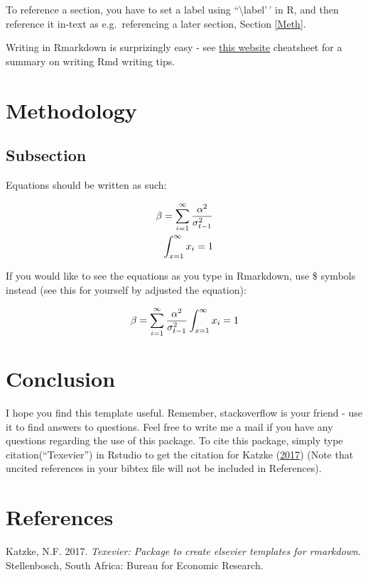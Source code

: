 \documentclass[11pt,preprint, authoryear]{elsarticle}
\numberwithin{equation}{section}
\numberwithin{figure}{section}
\numberwithin{table}{section}
\newlength{\cslhangindent}
\newenvironment{CSLReferences}%
  {\setlength{\parindent}{0pt}%
  \everypar{\setlength{\hangindent}{\cslhangindent}}\ignorespaces}%
  {\par}
\begin{document}
To reference a section, you have to set a label using
``\textbackslash label'\,' in R, and then reference it in-text as
e.g.~referencing a later section, Section \ref{Meth}.

Writing in Rmarkdown is surprizingly easy - see
\href{https://www.rstudio.com/wp-content/uploads/2015/03/rmarkdown-reference.pdf}{this
website} cheatsheet for a summary on writing Rmd writing tips.

\hypertarget{methodology}{%
\section{\texorpdfstring{Methodology
\label{Meth}}{Methodology }}\label{methodology}}

\hypertarget{subsection}{%
\subsection{Subsection}\label{subsection}}

Equations should be written as such:

\begin{align}
\beta = \sum_{i = 1}^{\infty}\frac{\alpha^2}{\sigma_{t-1}^2} \label{eq1} \\
\int_{x = 1}^{\infty}x_{i} = 1 \notag
\end{align}

If you would like to see the equations as you type in Rmarkdown, use \$
symbols instead (see this for yourself by adjusted the equation):

\[
\beta = \sum_{i = 1}^{\infty}\frac{\alpha^2}{\sigma_{t-1}^2} \\
\int_{x = 1}^{\infty}x_{i} = 1
\]

\hypertarget{conclusion}{%
\section{Conclusion}\label{conclusion}}

I hope you find this template useful. Remember, stackoverflow is your
friend - use it to find answers to questions. Feel free to write me a
mail if you have any questions regarding the use of this package. To
cite this package, simply type citation(``Texevier'') in Rstudio to get
the citation for Katzke (\protect\hyperlink{ref-Texevier}{2017}) (Note
that uncited references in your bibtex file will not be included in
References).

\newpage

\hypertarget{references}{%
\section*{References}\label{references}}

\hypertarget{refs}{}
\begin{CSLReferences}{1}{0}
\leavevmode{}%
Katzke, N.F. 2017. \emph{{Texevier}: {P}ackage to create elsevier
templates for rmarkdown}. Stellenbosch, South Africa: Bureau for
Economic Research.

\end{CSLReferences}


\end{document}
